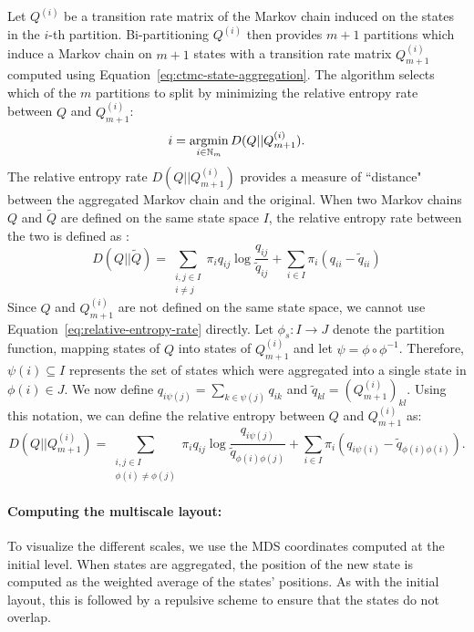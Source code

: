  Let $Q^{(i)}$ be a transition rate matrix of the Markov chain induced on the states in the $i$-th partition. Bi-partitioning $Q^{(i)}$ then provides $m+1$ partitions which induce a Markov chain on $m+1$ states with a transition rate matrix $Q_{m+1}^{(i)}$ computed using Equation~\ref{eq:ctmc-state-aggregation}. The algorithm selects which of the $m$ partitions to split by minimizing the relative entropy rate between $Q$ and $Q_{m+1}^{(i)}$:
\begin{equation}
	i = \argmin\limits_{i \in \mathbb{N}_m} D(Q || Q_{m+1}^{(i)}).
\end{equation}
The relative entropy rate $D(Q || Q_{m+1}^{(i)})$ provides a measure of ``distance" between the aggregated Markov chain and the original. When two Markov chains $Q$ and $\tilde{Q}$ are defined on the same state space $I$, the relative entropy rate between the two is defined as \cite{EJP374}:
\begin{equation}
	\label{eq:relative-entropy-rate}
	D(Q || \tilde{Q}) = \sum\limits_{\substack{i,j \in I \\ i \neq j}}\pi_i q_{ij} \log\frac{q_{ij}}{\tilde{q}_{ij}} + \sum\limits_{i \in I}\pi_i(q_{ii} - \tilde{q}_{ii})
\end{equation}
Since $Q$ and $Q_{m+1}^{(i)}$ are not defined on the same state space, we cannot use Equation~\ref{eq:relative-entropy-rate} directly. Let $\phi_s: I \rightarrow J$ denote the partition function, mapping states of $Q$ into states of $Q_{m+1}^{(i)}$ and let $\psi = \phi \circ \phi^{-1}$. Therefore, $\psi(i) \subseteq I$  represents the set of states which were aggregated into a single state in $\phi(i) \in J$. We now define $q_{i\psi(j)} = \sum_{k \in \psi(j)}q_{ik}$ and $\tilde{q}_{kl} = \left(Q_{m+1}^{(i)}\right)_{kl}$. Using this notation, we can define the relative entropy between $Q$ and $Q_{m+1}^{(i)}$ as:
\begin{equation}
	D(Q || Q_{m+1}^{(i)}) = \sum\limits_{\substack{i,j \in I \\ \phi(i) \neq \phi(j)}}\pi_i q_{ij}\log\frac{q_{i\psi(j)}}{\tilde{q}_{\phi(i)\phi(j)}} + \sum\limits_{i \in I}\pi_i \left(q_{i\psi(i)} - \tilde{q}_{\phi(i)\phi(i)}\right).
\end{equation}
%
\noindent \paragraph{\bf Computing the multiscale layout:}
To visualize the different scales, we use the MDS coordinates computed at the initial level. When states are aggregated, the position of the new state is computed as the weighted average of the states' positions. As with the initial layout, this is followed by a repulsive scheme to ensure that the states do not overlap.


